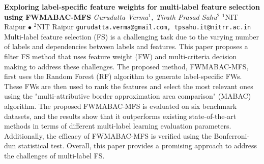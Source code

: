 
    \begin{conf-abstract}[]
        {\textbf{Exploring label-specific feature weights for multi-label feature selection using FWMABAC-MFS}}
        {\textit{Gurudatta Verma$^{1}$, Tirath Prasad Sahu$^{2}$}}
        {$^{1}$NIT Raipur $\bullet$ $^{2}$NIT Raipur}
        {\texttt{gurudatta.verma@gmail.com, tpsahu.it@nitrr.ac.in}}
        {Multi-label feature selection (FS) is a challenging task due to the varying number of labels and dependencies between labels and features. This paper proposes a filter FS method that uses feature weight (FW) and multi-criteria decision making to address these challenges. The proposed method, FWMABAC-MFS, first uses the Random Forest (RF) algorithm to generate label-specific FWs. These FWs are then used to rank the features and select the most relevant ones using the "multi-attributive border approximation area comparison" (MABAC) algorithm. The proposed FWMABAC-MFS is evaluated on six benchmark datasets, and the results show that it outperforms existing state-of-the-art methods in terms of different multi-label learning evaluation parameters. Additionally, the efficacy of FWMABAC-MFS is verified using the Bonferroni-dun statistical test. Overall, this paper provides a promising approach to address the challenges of multi-label FS.}
    \end{conf-abstract}
        